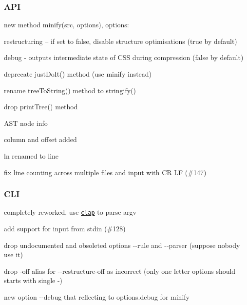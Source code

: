 \subsubsection*{A\+PI}


\begin{DoxyItemize}
\item new method {\ttfamily minify(src, options)}, options\+:
\begin{DoxyItemize}
\item {\ttfamily restructuring} – if set to {\ttfamily false}, disable structure optimisations ({\ttfamily true} by default)
\item {\ttfamily debug} -\/ outputs intermediate state of C\+SS during compression ({\ttfamily false} by default)
\end{DoxyItemize}
\item deprecate {\ttfamily just\+Do\+It()} method (use {\ttfamily minify} instead)
\item rename {\ttfamily tree\+To\+String()} method to {\ttfamily stringify()}
\item drop {\ttfamily print\+Tree()} method
\item A\+ST node info
\begin{DoxyItemize}
\item {\ttfamily column} and {\ttfamily offset} added
\item {\ttfamily ln} renamed to {\ttfamily line}
\item fix line counting across multiple files and input with CR LF (\#147)
\end{DoxyItemize}
\end{DoxyItemize}

\subsubsection*{C\+LI}


\begin{DoxyItemize}
\item completely reworked, use \href{https://github.com/lahmatiy/clap}{\tt clap} to parse argv
\item add support for input from stdin (\#128)
\item drop undocumented and obsoleted options {\ttfamily -\/-\/rule} and {\ttfamily -\/-\/parser} (suppose nobody use it)
\item drop {\ttfamily -\/off} alias for {\ttfamily -\/-\/restructure-\/off} as incorrect (only one letter options should starts with single {\ttfamily -\/})
\item new option {\ttfamily -\/-\/debug} that reflecting to {\ttfamily options.\+debug} for {\ttfamily minify}
\end{DoxyItemize}

